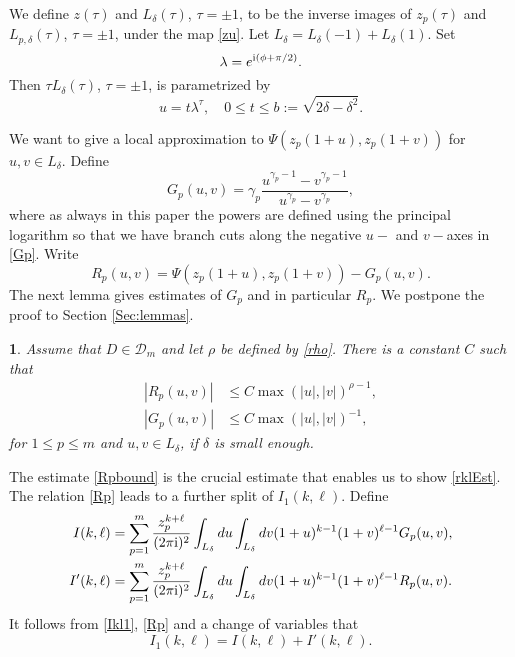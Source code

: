 \documentclass{article}
\numberwithin{equation}{section}
\numberwithin{figure}{section}
\theoremstyle{plain}
\theoremstyle{plain}
\newtheorem{lemma}[thm]{\protect\lemmaname}
\numberwithin{thm}{section}
\theoremstyle{remark}
\providecommand{\lemmaname}{Lemma}
\newcommand{\I}{{\rm i}}
\let \le \leqslant
\begin{document}
We define $z(\tau)$ and $L_\delta(\tau)$, $\tau=\pm1$, to be the inverse images of $z_p(\tau)$ and $L_{p,\delta}(\tau)$, $\tau=\pm1$, under the
map \eqref{zu}. Let $L_\delta=L_\delta(-1)+L_\delta(1)$. Set
\begin{equation}\label{lambda}
\lambda=e^{\I(\phi+\pi/2)}.
\end{equation}
Then $\tau L_{\delta}(\tau)$, $\tau=\pm1$, is parametrized by
\begin{equation}\label{Lpar}
u=t\lambda^\tau, \quad 0\le t\le b:=\sqrt{2\delta-\delta^2}.
\end{equation}

We want to give a local approximation to $\Psi(z_p(1+u),z_p(1+v))$ for $u,v\in L_\delta$. Define
\begin{equation}\label{Gp}
G_p(u,v)=\gamma_p\frac{u^{\gamma_p-1}-v^{\gamma_p-1}}{u^{\gamma_p}-v^{\gamma_p}},
\end{equation}
where as always in this paper the powers are defined using the principal logarithm so that we have branch cuts along the negative $u-$ and $v-$axes in \eqref{Gp}. Write
\begin{equation}\label{Rp}
R_p(u,v)=\Psi(z_p(1+u),z_p(1+v))-G_p(u,v).
\end{equation}
The next lemma gives estimates of $G_p$ and in particular $R_p$. We postpone the proof to Section \ref{Sec:lemmas}.

\begin{lemma}\label{Lem:GpRp}
Assume that $D\in\mathcal{D}_m$ and let $\rho$ be defined by \eqref{rho}. There is a constant $C$ such that
\begin{align}
|R_p(u,v)|&\le C\max(|u|,|v|)^{\rho-1},\label{Rpbound}\\
|G_p(u,v)|&\le C\max(|u|,|v|)^{-1},\label{Gpbound}
\end{align}
for $1\le p\le m$ and $u,v\in L_\delta$, if $\delta$ is small enough.
\end{lemma}

The estimate \eqref{Rpbound} is the crucial estimate that enables us to show \eqref{rklEst}.
The relation \eqref{Rp} leads to a further split of $I_1(k,\ell)$. Define
\begin{align}
I(k,\ell)&=\sum_{p=1}^m\frac{z_p^{k+\ell}}{(2\pi\I)^2}\int_{L_\delta}du\int_{L_\delta}dv (1+u)^{k-1}(1+v)^{\ell-1}G_p(u,v), \label{Ikl}\\
I'(k,\ell)&=\sum_{p=1}^m\frac{z_p^{k+\ell}}{(2\pi\I)^2}\int_{L_\delta}du\int_{L_\delta}dv (1+u)^{k-1}(1+v)^{\ell-1}R_p(u,v) \label{Iklprime}.
\end{align}
It follows from \eqref{Ikl1}, \eqref{Rp} and a change of variables that
\begin{equation}\label{Ikl1split}
I_1(k,\ell)=I(k,\ell)+I'(k,\ell).
\end{equation}
\end{document}
